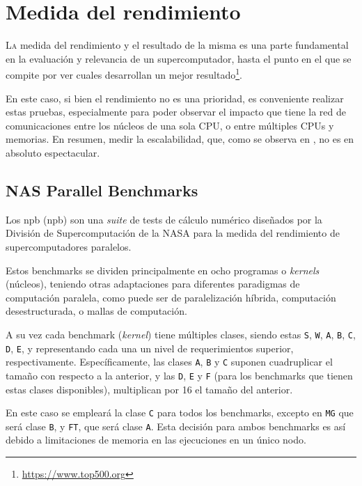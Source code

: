 \chapter{Medida del rendimiento}
\label{chap:medida_rendimiento}

\lettrine{L}{a} medida del rendimiento y el resultado de la misma es una parte fundamental en la evaluación y relevancia de un supercomputador, hasta el punto en el que se compite por ver cuales desarrollan un mejor resultado\footnote{\url{https://www.top500.org}}.

En este caso, si bien el rendimiento no es una prioridad, es conveniente realizar estas pruebas, especialmente para poder observar el impacto que tiene la red de comunicaciones entre los núcleos de una sola CPU, o entre múltiples CPUs y memorias. En resumen, medir la escalabilidad, que, como se observa en , no es en absoluto espectacular.

\section{NAS Parallel Benchmarks}
Los \acrlong{npb} (\acrshort{npb}) \cite{npb_webpage} son una \textit{suite} de tests de cálculo numérico diseñados por la División de Supercomputación de la NASA para la medida del rendimiento de supercomputadores paralelos.

Estos benchmarks se dividen principalmente en ocho programas o \textit{kernels} (núcleos), teniendo otras adaptaciones para diferentes paradigmas de computación paralela, como puede ser de paralelización híbrida, computación desestructurada, o mallas de computación.

A su vez cada benchmark (\textit{kernel}) tiene múltiples clases, siendo estas \texttt{S}, \texttt{W}, \texttt{A}, \texttt{B}, \texttt{C}, \texttt{D}, \texttt{E}, y representando cada una un nivel de requerimientos superior, respectivamente. Específicamente, las clases \texttt{A}, \texttt{B} y \texttt{C} suponen cuadruplicar el tamaño con respecto a la anterior, y las \texttt{D}, \texttt{E} y \texttt{F} (para los benchmarks que tienen estas clases disponibles), multiplican por 16 el tamaño del anterior.

En este caso se empleará la clase \texttt{C} para todos los benchmarks, excepto en \texttt{MG} que será clase \texttt{B}, y \texttt{FT}, que será clase \texttt{A}. Esta decisión para ambos benchmarks es así debido a limitaciones de memoria en las ejecuciones en un único nodo.

